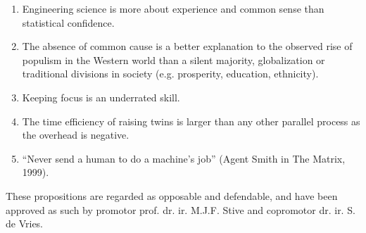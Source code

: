 \documentclass[headinclude,footinclude,cleardoublepage=empty,
numbers=noenddot,fontsize=9pt]{scrbook}
\begin{document}
\begin{titlepage}
\begin{enumerate}
  \item Engineering science is more about experience and common sense
    than statistical confidence.

  \item The absence of common cause is a better explanation to the
    observed rise of populism in the Western world than a silent
    majority, globalization or traditional divisions in society
    (e.g. prosperity, education, ethnicity).
    


  \item Keeping focus is an underrated skill.

  \item The time efficiency of raising twins is larger than any other
    parallel process as the overhead is negative.

  \item ``Never send a human to do a machine's job'' (Agent Smith in
    The Matrix, 1999).

  \end{enumerate}

  \vfill

  \noindent These propositions are regarded as opposable and
  defendable, and have been approved as such by promotor
  prof. dr. ir. M.J.F. Stive and copromotor dr. ir. S. de Vries.

\end{titlepage}
\end{document}
